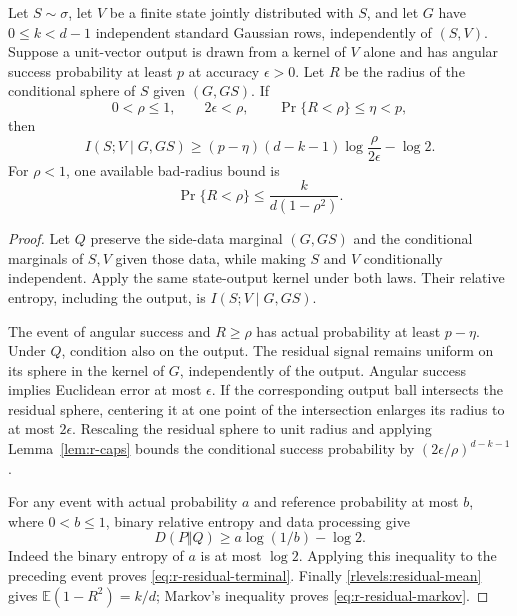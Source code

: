 \begin{lemma}
\label{lem:r-residual-terminal}
Let \(S\sim\sigma\), let \(V\) be a finite state jointly
distributed with \(S\), and let \(G\) have \(0\le k<d-1\)
independent standard Gaussian rows, independently of \((S,V)\).
Suppose a unit-vector output is drawn from a kernel of \(V\) alone
and has angular success probability at least \(p\) at accuracy
\(\epsilon>0\).  Let \(R\) be the radius of the conditional
sphere of \(S\) given \((G,GS)\).  If
\[
 0<\rho\le1,\qquad 2\epsilon<\rho,\qquad
 \Pr\{R<\rho\}\le\eta<p,
\]
then
\begin{equation}\label{eq:r-residual-terminal}
 I(S;V\mid G,GS)
 \ge(p-\eta)(d-k-1)\log\frac{\rho}{2\epsilon}-\log2.
\end{equation}
For \(\rho<1\), one available bad-radius bound is
\begin{equation}\label{eq:r-residual-markov}
 \Pr\{R<\rho\}\le\frac{k}{d(1-\rho^2)}.
\end{equation}
\end{lemma}

\begin{proof}
Let \(Q\) preserve the side-data marginal \((G,GS)\) and the
conditional marginals of \(S,V\) given those data, while making
\(S\) and \(V\) conditionally independent.  Apply the same
state-output kernel under both laws.  Their relative entropy,
including the output, is \(I(S;V\mid G,GS)\).

The event of angular success and \(R\ge\rho\) has actual
probability at least \(p-\eta\).  Under \(Q\), condition also
on the output.  The residual signal remains uniform on its sphere
in the kernel of \(G\), independently of the output.  Angular
success implies Euclidean error at most \(\epsilon\).  If the
corresponding output ball intersects the residual sphere, centering
it at one point of the intersection enlarges its radius to at most
\(2\epsilon\).  Rescaling the residual sphere to unit radius
and applying Lemma~\ref{lem:r-caps} bounds the conditional success
probability by \((2\epsilon/\rho)^{d-k-1}\).

For any event with actual probability \(a\) and reference
probability at most \(b\), where \(0<b\le1\), binary relative
entropy and data processing give
\begin{equation}\label{rlevels:binary-kl}
 D(P\Vert Q)\ge a\log(1/b)-\log2.
\end{equation}
Indeed the binary entropy of \(a\) is at most \(\log2\).
Applying this inequality to the preceding event proves
\eqref{eq:r-residual-terminal}.  Finally
\eqref{rlevels:residual-mean} gives
\(\mathbb E(1-R^2)=k/d\); Markov's inequality proves
\eqref{eq:r-residual-markov}.
\end{proof}

